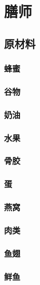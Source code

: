 \documentclass[12pt,a4paper,landscape]{article}
\begin{document}
\begin{CJK}{UTF8}{gbsn}
\subsubsection{}
\subsubsection{}
\subsubsection{}


\section{膳师}

\subsection{原材料}
\subsubsection{蜂蜜}
\subsubsection{谷物}
\subsubsection{奶油}
\subsubsection{水果}
\subsubsection{骨胶}
\subsubsection{蛋}
\subsubsection{燕窝}
\subsubsection{肉类}
\subsubsection{鱼翅}
\subsubsection{鲜鱼}




\end{CJK}
\end{document}
